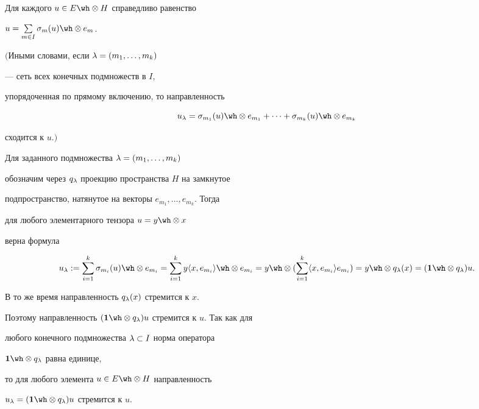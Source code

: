 \begin{lem}


\label{L1}


Для каждого $u \in E \tens H$ справедливо равенство


$u=\sum\limits_{m \in I}


\si_m(u) \tens e_m$.





$($Иными словами, если $\lambda =(m_1,\dotsc,m_k)$


--- сеть всех конечных подмножеств в $I$,


упорядоченная по прямому включению, то направленность


$$


u_ \la =\si_{m_1}(u)\tens e_{m_1}


+\dotsb+\si_{m_k}(u)\tens e_{m_k}


$$


сходится к $u.)$


\end{lem}





\begin{pf}


Для заданного подмножества $\lambda=(m_1,\dotsc,m_k)$


обозначим через $q_\lambda$ проекцию пространства $H$ на замкнутое 


подпространство, натянутое на векторы $e_{m_1},\dotsc,e_{m_k}$. Тогда


для любого элементарного тензора $u=y \tens x$


верна формула


$$


u_\la : =\sumk \si_{m_i} (u) \tens e_{m_i}=\sumk y\lan x,e_{m_i}\ran \tens


e_{m_i}= y \tens (\sumk \lan x,e_{m_i}\ran e_{m_i})= y \tens q_\la (x)=


(\ed \tens q_\la)u.


$$


В то же время направленность $q_\lambda (x)$ стремится к $x$.


Поэтому направленность $(\ed \tens q_\la)u$ стремится к $u$. Так как для


любого конечного подмножества $\lambda \subset I$ норма оператора


$\ed \tens q_\la$ равна единице, 


то для любого элемента $u \in E \tens H$ направленность


$u_ \la=(\ed \tens q_\la)u$ стремится к $u$.


\end{pf}





